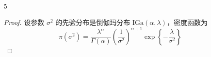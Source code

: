 \documentclass[normal,founder,mtpro2,cn]{elegantnote}
\begin{document}
\begin{enumerate}
\begin{proof}
            可得样本 $x_{1},x_{2},\ldots,x_{n}$ 的边际分布为
            \begin{equation*}
                \begin{aligned}
                    m(x_{1},x_{2},\ldots,x_{n})= & \int_{-\infty}^{+\infty}\frac{\beta^{\alpha}\cdot\lambda^{\sum_{i=1}^{n}x_{i}+\alpha-1}}{\Gamma(\alpha)\cdot x_{1}!\ldots x_{n}!}\mathrm{e}^{-\left(\beta+n\right)\lambda}\cdot\mathrm{I}_{\lambda>0}\,\mathrm{d}\lambda \\
                    =                            & \frac{\beta^{\alpha}}{\Gamma(\alpha)\cdot x_{1}!\ldots x_{n}!}\cdot\int_{0}^{+\infty}\lambda^{\sum_{i=1}^{n}x_{i}+\alpha-1}\mathrm{e}^{-\left(\beta+n\right)\lambda}\,\mathrm{d}\lambda                                  \\
                    =                            & \frac{\beta^{\alpha}}{\Gamma(\alpha)\cdot x_{1}!\ldots x_{n}!}\cdot\frac{\Gamma\left(\sum_{i=1}^{n}x_{i}+\alpha\right)}{(\beta+n)^{\sum_{i=1}^{n}x_{i}+\alpha}}
                \end{aligned}
            \end{equation*}

            因此 $\lambda$ 的后验分布为
            \begin{equation*}
                \pi\left(\lambda\mid x_{1},x_{2},\ldots,x_{n}\right)=\frac{(\beta+n)^{\sum_{i=1}^{n}x_{i}+\alpha}}{\Gamma\left(\sum_{i=1}^{n}x_{i}+\alpha\right)} \lambda^{\sum_{i=1}^{n}x_{i}+\alpha-1} \mathrm{e}^{-\left(\beta+n\right)\lambda},\quad\lambda>0
            \end{equation*}

            即，
            \begin{equation*}
                \lambda\mid x_{1},x_{2},\ldots,x_{n}\sim\text{Ga}\left(\sum_{i=1}^{n}x_{i}+\alpha,\beta+n\right)
            \end{equation*}

            故，伽玛分布是泊松分布的均值 $\lambda$ 的共轭先验分布。
        \end{proof}
    \item[5]
        \begin{proof}
            设参数 $\sigma^{2}$ 的先验分布是倒伽玛分布 $\text{IGa}\left(\alpha,\lambda\right)$，密度函数为
            \begin{equation*}
                \pi\left(\sigma^{2}\right)=\frac{\lambda^{\alpha}}{\Gamma(\alpha)}\left(\frac{1}{\sigma^{2}}\right)^{\alpha+1}\exp\left\{-\frac{\lambda}{\sigma^{2}}\right\}
            \end{equation*}


\end{proof}
\end{enumerate}
\end{document}
